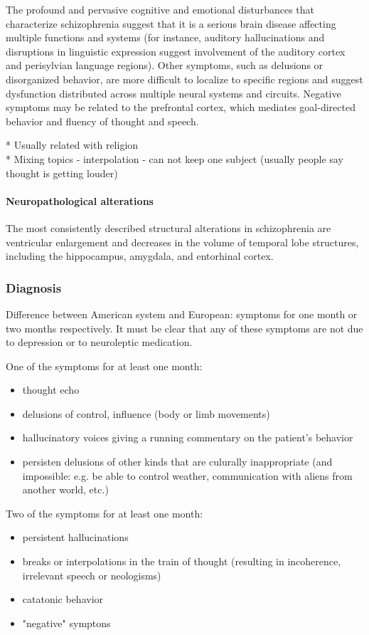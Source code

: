\documentclass[12pt,article,oneside,a4paper]{memoir}
\begin{document}
The profound and pervasive cognitive and emotional disturbances that characterize
schizophrenia suggest that it is a serious brain disease affecting multiple
functions and systems (for instance, auditory hallucinations and disruptions in
linguistic expression suggest involvement of the auditory cortex and perisylvian
language regions). Other symptoms, such as delusions or disorganized behavior,
are more difficult to localize to specific regions and suggest dysfunction
distributed across multiple neural systems and circuits. Negative symptoms may
be related to the prefrontal cortex, which mediates goal-directed behavior and
fluency of thought and speech.

* Usually related with religion \\
* Mixing topics - interpolation - can not keep one subject (usually people say 
thought is getting louder)\\

\paragraph{Neuropathological alterations}
The most consistently described structural alterations in schizophrenia are
ventricular enlargement and decreases in the volume of temporal lobe structures,
including the hippocampus, amygdala, and entorhinal cortex.

\subsubsection{Diagnosis}
Difference between American system and European: symptoms for one month or two
months respectively. It must be clear that any of these symptoms are not due to
depression or to neuroleptic medication.

One of the symptoms for at least one month:
\begin{itemize}
\item thought echo
\item delusions of control, influence (body or limb movements)
\item hallucinatory voices giving a running commentary on the patient's behavior
\item persisten delusions of other kinds that are culurally inappropriate
(and impossible: e.g. be able to control weather, communication with aliens from 
another world, etc.)
\end{itemize}

Two of the symptoms for at least one month:
\begin{itemize}
\item persistent hallucinations
\item breaks or interpolations in the train of thought (resulting in incoherence,
irrelevant speech or neologisms)
\item catatonic behavior
\item "negative" symptons
\end{itemize}
\end{document}
